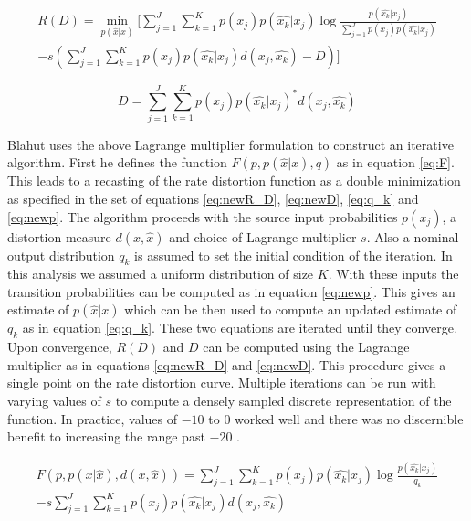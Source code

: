 \documentclass[journal]{IEEEtran}
\begin{document}
\begin{multline}
\label{eq:lagrange}
R(D) = \min_{p(\hat{x}|x)}\biggl[\sum_{j=1}^{J}\sum_{k=1}^{K}p(x_j)p(\hat{x_k}|x_j)\log{\frac{p(\hat{x_k}|x_j)}{\sum_{j=1}^{J}p(x_j)p(\hat{x_k}|x_j)}} \\ - s\left(\sum_{j=1}^{J}\sum_{k=1}^{K}p(x_j)p(\hat{x_k}|x_j)d(x_j, \hat{x_k}) - D\right)\biggr]
\end{multline}

\begin{equation}
\label{eq:lagrangeD}
D = \sum_{j=1}^{J}\sum_{k=1}^{K} p(x_j)p(\hat{x_k}|x_j)^*d(x_j,\hat{x_k})
\end{equation}

\par Blahut uses the above Lagrange multiplier formulation to construct an iterative algorithm. First he defines the function \(F(p,p(\hat{x}|x),q)\) as in equation \ref{eq:F}. This leads to a recasting of the rate distortion function as a double minimization as specified in the set of equations \ref{eq:newR_D}, \ref{eq:newD}, \ref{eq:q_k} and \ref{eq:newp}. The algorithm proceeds with the source input probabilities \(p(x_j)\), a distortion measure \(d(x,\hat{x})\) and choice of Lagrange multiplier \(s\). Also a nominal output distribution \(q_k\) is assumed to set the initial condition of the iteration. In this analysis we assumed a uniform distribution of size \(K\). With these inputs the transition probabilities can be computed as in equation \ref{eq:newp}. This gives an estimate of \(p(\hat{x}|x)\) which can be then used to compute an updated estimate of \(q_k\) as in equation \ref{eq:q_k}. These two equations are iterated until they converge. Upon convergence, \(R(D)\) and \(D\) can be computed using the Lagrange multiplier as in equations \ref{eq:newR_D} and \ref{eq:newD}. This procedure gives a single point on the rate distortion curve. Multiple iterations can be run with varying values of \(s\) to compute a densely sampled discrete representation of the function. In practice, values of \(-10\) to \(0\) worked well and there was no discernible benefit to increasing the range past \(-20\) \cite{blahut}.

\begin{multline}
\label{eq:F}
F(p,p(x|\hat{x}), d(x, \hat{x})) = \sum_{j=1}^{J}\sum_{k=1}^{K}p(x_j)p(\hat{x_k}|x_j)\log{\frac{p(\hat{x_k}|x_j)}{q_k}} \\
- s\sum_{j=1}^{J}\sum_{k=1}^{K}p(x_j)p(\hat{x_k}|x_j)d(x_j,\hat{x_k})
\end{multline}
\end{document}
